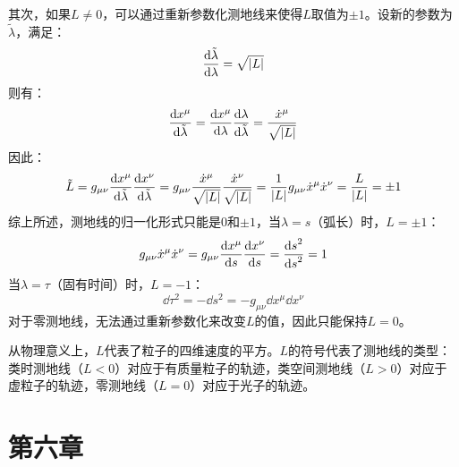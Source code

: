 \documentclass[a4paper]{article}
\begin{document}
\begin{enumerate}
\begin{enumerate}
        其次，如果$L \neq 0$，可以通过重新参数化测地线来使得$L$取值为$\pm 1$。设新的参数为$\tilde{\lambda}$，满足：
        \[
            \dv{\tilde{\lambda}}{\lambda} = \sqrt{\abs{L}}
        \]
        则有：
        \[
            \dv{x^\mu}{\tilde{\lambda}} = \dv{x^\mu}{\lambda} \dv{\lambda}{\tilde{\lambda}} = \frac{\dot{x}^\mu}{\sqrt{\abs{L}}}
        \]
        因此：
        \[
            \tilde{L}
            = g_{\mu\nu} \dv{x^\mu}{\tilde{\lambda}} \dv{x^\nu}{\tilde{\lambda}}
            = g_{\mu\nu} \frac{\dot{x}^\mu}{\sqrt{\abs{L}}} \frac{\dot{x}^\nu}{\sqrt{\abs{L}}}
            = \frac{1}{\abs{L}} g_{\mu\nu} \dot{x}^\mu \dot{x}^\nu
            = \frac{L}{\abs{L}}
            = \pm 1
        \]
        综上所述，测地线的归一化形式只能是0和$\pm 1$，当$\lambda = s$（弧长）时，$L = \pm 1$：
        \[
            g_{\mu\nu} \dot{x}^\mu \dot{x}^\nu = g_{\mu\nu} \dv{x^\mu}{s} \dv{x^\nu}{s} = \frac{\dd{s}^2}{\dd{s}^2} = 1
        \]
        当$\lambda = \tau$（固有时间）时，$L = -1$：
        \[
            \dd{\tau}^2 = -\dd{s}^2 = -g_{\mu\nu} \dd{x^\mu} \dd{x^\nu}
        \]
        对于零测地线，无法通过重新参数化来改变$L$的值，因此只能保持$L = 0$。

        从物理意义上，$L$代表了粒子的四维速度的平方。$L$的符号代表了测地线的类型：类时测地线（$L < 0$）对应于有质量粒子的轨迹，类空间测地线（$L > 0$）对应于虚粒子的轨迹，零测地线（$L = 0$）对应于光子的轨迹。
    \end{enumerate}

\end{enumerate}

\clearpage
\section*{第六章}
\end{document}
